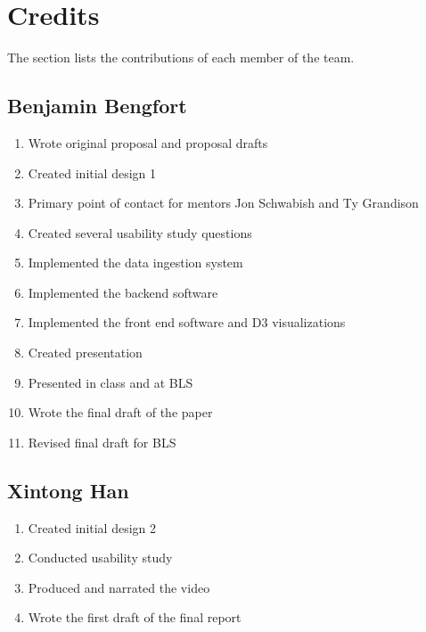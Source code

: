 \documentclass{sigchi}
\begin{document}
\balance{}




\newpage{}

\balance{}

\section{Credits}

The section lists the contributions of each member of the team.

\subsection{Benjamin Bengfort}

\begin{enumerate}
    \item Wrote original proposal and proposal drafts
    \item Created initial design 1
    \item Primary point of contact for mentors Jon Schwabish and Ty Grandison
    \item Created several usability study questions
    \item Implemented the data ingestion system
    \item Implemented the backend software
    \item Implemented the front end software and D3 visualizations
    \item Created presentation
    \item Presented in class and at BLS
    \item Wrote the final draft of the paper
    \item Revised final draft for BLS
\end{enumerate}

\subsection{Xintong Han}

\begin{enumerate}
    \item Created initial design 2
    \item Conducted usability study
    \item Produced and narrated the video
    \item Wrote the first draft of the final report
\end{enumerate}
\end{document}
